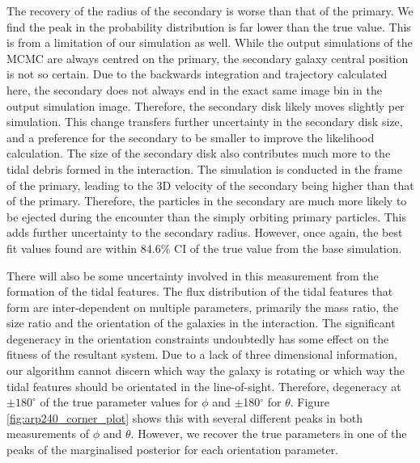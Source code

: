 The recovery of the radius of the secondary is worse than that of the primary. We find the peak in the probability distribution is far lower than the true value. This is from a limitation of our simulation as well. While the output simulations of the MCMC are always centred on the primary, the secondary galaxy central position is not so certain. Due to the backwards integration and trajectory calculated here, the secondary does not always end in the exact same image bin in the output simulation image. Therefore, the secondary disk likely moves slightly per simulation. This change transfers further uncertainty in the secondary disk size, and a preference for the secondary to be smaller to improve the likelihood calculation. The size of the secondary disk also contributes much more to the tidal debris formed in the interaction. The simulation is conducted in the frame of the primary, leading to the 3D velocity of the secondary being higher than that of the primary. Therefore, the particles in the secondary are much more likely to be ejected during the encounter than the simply orbiting primary particles. This adds further uncertainty to the secondary radius. However, once again, the best fit values found are within 84.6\% CI of the true value from the base simulation. 

There will also be some uncertainty involved in this measurement from the formation of the tidal features. The flux distribution of the tidal features that form are inter-dependent on multiple parameters, primarily the mass ratio, the size ratio and the orientation of the galaxies in the interaction. The significant degeneracy in the orientation constraints undoubtedly has some effect on the fitness of the resultant system. Due to a lack of three dimensional information, our algorithm cannot discern which way the galaxy is rotating or which way the tidal features should be orientated in the line-of-sight. Therefore, degeneracy at $\pm180^{\circ}$ of the true parameter values for $\phi$ and $\pm$180$^{\circ}$ for $\theta$. Figure \ref{fig:arp240_corner_plot} shows this with several different peaks in both measurements of $\phi$ and $\theta$. However, we recover the true parameters in one of the peaks of the marginalised posterior for each orientation parameter.

